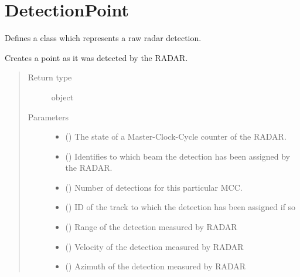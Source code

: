 \documentclass[letterpaper,10pt,english]{Reference manual}
\begin{document}
\section{DetectionPoint}
\label{\detokenize{datacontainers:detectionpoint}}
Defines a class which represents a raw radar detection.

\begin{fulllineitems}
\label{\detokenize{datacontainers:data_containers.DetectionPoint}}
Creates a point as it was detected by the RADAR.
\begin{quote}\begin{description}
\item[{Return type}] \leavevmode
object

\item[{Parameters}] \leavevmode\begin{itemize}
\item {} 
 () \textendash{} The state of a Master-Clock-Cycle counter of the RADAR.

\item {} 
 () \textendash{} Identifies to which beam the detection has been assigned by the RADAR.

\item {} 
 () \textendash{} Number of detections for this particular MCC.

\item {} 
 () \textendash{} ID of the track to which the detection has been assigned if so

\item {} 
 () \textendash{} Range of the detection measured by RADAR

\item {} 
 () \textendash{} Velocity of the detection measured by RADAR

\item {} 
 () \textendash{} Azimuth of the detection measured by RADAR


\end{itemize}
\end{description}
\end{quote}
\end{fulllineitems}
\end{document}
